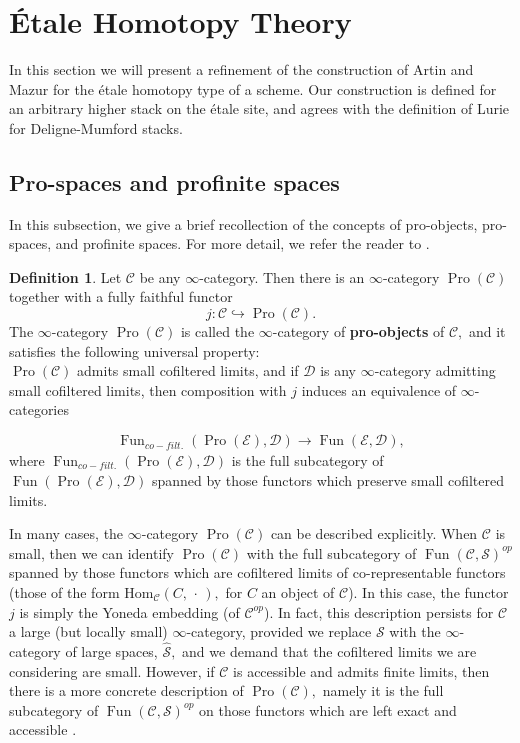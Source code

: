 \documentclass[12pt]{amsart}
\theoremstyle{definition}
\newtheorem{definition}[dummy]{Definition}
\newcommand{\cD}{\mathcal{D}}
\newcommand{\cS}{\mathcal{S}}
\newcommand{\sC}{\mathscr{C}}
\newcommand{\sD}{\mathscr{D}}
\newcommand{\sE}{\mathscr{E}}
\newcommand{\Hom}{\mathrm{Hom}}
\renewcommand{\i}{\infty}
\def\Pro{\operatorname{Pro}}
\def\Fun{\operatorname{Fun}}
\def\blank{\mspace{3mu}\cdot\mspace{3mu}}
\begin{document}
\newpage


\section{\'Etale Homotopy Theory}
In this section we will present a refinement of the construction of Artin and Mazur for the \'etale homotopy type of a scheme. Our construction is defined for an arbitrary higher stack on the \'etale site, and agrees with the definition of Lurie for Deligne-Mumford stacks.

\subsection{Pro-spaces and profinite spaces}
In this subsection, we give a brief recollection of the concepts of pro-objects, pro-spaces, and profinite spaces. For more detail, we refer the reader to \cite[Section 2]{knhom}.
\begin{definition}
Let $\sC$ be any $\i$-category. Then there is an $\i$-category $\Pro\left(\sC\right)$ together with a fully faithful functor $$j:\sC \hookrightarrow \Pro\left(\sC\right).$$ The $\i$-category $\Pro\left(\sC\right)$ is called the $\i$-category of \textbf{pro-objects} of $\sC,$ and it satisfies the following universal property:\\


$\Pro\left(\sC\right)$ admits small cofiltered limits, and if $\cD$ is any $\i$-category admitting small cofiltered limits, then composition with $j$ induces an equivalence of $\i$-categories

\begin{equation}\label{eq:pro}
\Fun_{\mathit{co-filt.}}\left(\Pro\left(\sE\right),\sD\right) \to \Fun\left(\sE,\sD\right),
\end{equation}
where $\Fun_{\mathit{co-filt.}}\left(\Pro\left(\sE\right),\sD\right)$ is the full subcategory of $\Fun\left(\Pro\left(\sE\right),\sD\right)$ spanned by those functors which preserve small cofiltered limits.
\end{definition}

In many cases, the $\i$-category $\Pro\left(\sC\right)$ can be described explicitly. When $\sC$ is small, then we can identify $\Pro\left(\sC\right)$ with the full subcategory of $\Fun\left(\sC,\cS\right)^{op}$ spanned by those functors which are cofiltered limits of co-representable functors (those of the form $\Hom_{\sC}\left(C,\blank\right),$ for $C$ an object of $\sC$). In this case, the functor $j$ is simply the Yoneda embedding (of $\sC^{op}$). In fact, this description persists for $\sC$ a large (but locally small) $\i$-category, provided we replace $\cS$ with the $\i$-category of large spaces, $\widehat{\cS},$ and we demand that the cofiltered limits we are considering are small. However, if $\sC$ is accessible and admits finite limits, then there is a more concrete description of $\Pro\left(\sC\right),$ namely it is the full subcategory of $\Fun\left(\sC,\cS\right)^{op}$ on those functors which are left exact and accessible \cite[Proposition 3.1.6]{dagxiii}.
\end{document}
